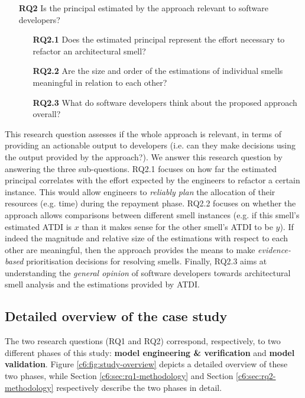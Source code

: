 \begin{itemize}
    \item[\textbf{RQ2}] Is the principal estimated by the approach relevant to software developers?    
    \begin{itemize}
        \item[\textbf{RQ2.1}] Does the estimated principal represent the effort necessary to refactor an architectural smell?
        \item[\textbf{RQ2.2}] Are the size and order of the estimations of individual smells meaningful in relation to each other? 
        \item[\textbf{RQ2.3}] What do software developers think about the proposed approach overall?
    \end{itemize} 
\end{itemize}
This research question assesses if the whole approach is relevant, in terms of providing an actionable output to developers (i.e. can they make decisions using the output provided by the approach?).
We answer this research question by answering the three sub-questions.
RQ2.1 focuses on how far the estimated principal correlates with the effort expected by the engineers to refactor a certain instance. 
This would allow engineers to \emph{reliably plan} the allocation of their resources (e.g. time) during the repayment phase.
RQ2.2 focuses on whether the approach allows comparisons between different smell instances (e.g. if this smell's estimated ATDI is $x$ than it makes sense for the other smell's ATDI to be $y$).
If indeed the magnitude and relative size of the estimations with respect to each other are meaningful, then the approach provides the means to make \emph{evidence-based} prioritisation decisions for resolving smells.
Finally, RQ2.3 aims at understanding the \emph{general opinion} of software developers towards architectural smell analysis and the estimations provided by ATDI.

\subsection{Detailed overview of the case study}
The two research questions (RQ1 and RQ2) correspond, respectively, to two different phases of this study: \textbf{model engineering \& verification} and \textbf{model validation}.
Figure \ref{c6:fig:study-overview} depicts a detailed overview of these two phases, while Section \ref{c6:sec:rq1-methodology} and Section \ref{c6:sec:rq2-methodology} respectively describe the two phases in detail.

